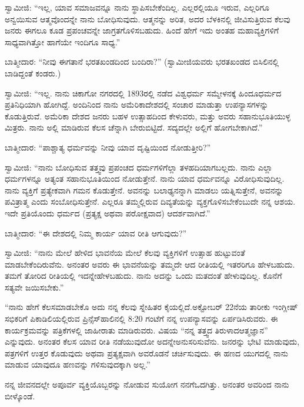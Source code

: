 ಸ್ವಾಮೀಜಿ: “ಇಲ್ಲ, ಯಾವ ಸಮಾಜವನ್ನೂ ನಾನು ಸ್ಥಾಪಿಸಬೇಕೆಂದಿಲ್ಲ. ಎಲ್ಲರಲ್ಲಿಯೂ ಇರುವ, ಎಲ್ಲರಿಗೂ ಅನ್ವಯಿಸುವ ಆತ್ಮವೊಂದನ್ನೇ ನಾನು ಬೋಧಿಸುವುದು. ಆತ್ಮನನ್ನು ಅರಿತ, ಅದರ ಬೆಳಕಿನಲ್ಲಿ ಜೀವಿಸುತ್ತಿರುವ ಕೆಲವು ಜನರು ಈಗಲೂ ಕೂಡ ಪ್ರಪಂಚವನ್ನೇ ಜಾಗ್ರತಗೊಳಿಸಬಹುದು. ಹಿಂದೆ ಹೇಗೆ ಇದು ಅಂತಹ ಮಹಾವ್ಯಕ್ತಿಗಳಿಗೆ ಸಾಧ್ಯವಾಗಿತ್ತೋ ಹಾಗೆಯೇ ಇಂದಿಗೂ ಸಾಧ್ಯ.”

ಬಾತ್ಮೀದಾರ: “ನೀವು ಈಗತಾನೆ ಭರತಖಂಡದಿಂದ ಬಂದಿರಾ?” (ಸ್ವಾಮೀಜಿಯವರು ಭರತಖಂಡದ ಬಿಸಿಲಿನಲ್ಲಿ ಬಾಡಿದ್ದಂತೆ ಕಂಡರು.)

ಸ್ವಾಮೀಜಿ: “ಇಲ್ಲ. ನಾನು ಚಿಕಾಗೋ ನಗರದಲ್ಲಿ 1893ರಲ್ಲಿ ನಡೆದ ವಿಶ್ವಧರ್ಮ ಸಮ್ಮೇಳನಕ್ಕೆ ಹಿಂದೂಧರ್ಮದ ಪ್ರತಿನಿಧಿಯಾಗಿ ಹೋಗಿದ್ದೆ. ಅಂದಿನಿಂದ ನಾನು ಅಮೆರಿಕಾ\break ದೇಶದಲ್ಲಿ ಸಂಚಾರ ಮಾಡುತ್ತಾ ಉಪನ್ಯಾಸಗಳನ್ನು ಕೊಡುತ್ತಿರುವೆ. ಅಮೆರಿಕಾ ದೇಶದ ಜನರು ಬಹಳ ಉತ್ಸಾಹದಿಂದ ಕೇಳುವರು, ಮತ್ತು ಅವರು ಸಹಾನುಭೂತಿಯುಳ್ಳ ಮಿತ್ರರು. ನಾನು ಅಲ್ಲಿ ಮಾಡಿರುವ ಕೆಲಸ ಚೆನ್ನಾಗಿ ಬೇರುಬಿಟ್ಟಿದೆ. ಸದ್ಯದಲ್ಲೇ ಅಲ್ಲಿಗೆ ಹೋಗಬೇಕಾಗಿದೆ.”

ಬಾತ್ಮೀದಾರ: “ಪಾಶ್ಚಾತ್ಯ ಧರ್ಮವನ್ನು ನೀವು ಯಾವ ದೃಷ್ಟಿಯಿಂದ ನೋಡುತ್ತೀರಿ?”

ಸ್ವಾಮೀಜಿ: “ನಾನು ಬೋಧಿಸುವ ತತ್ತ್ವವು ಪ್ರಪಂಚದ ಧರ್ಮಗಳಿಗೆಲ್ಲಾ ತಳಹದಿಯಾಗಬಲ್ಲದು. ನಾನು ಎಲ್ಲಾ ಧರ್ಮಗಳನ್ನೂ ಅತ್ಯಂತ ಸಹಾನುಭೂತಿಯಿಂದ ನೋಡುತ್ತೇನೆ. ನಾನು ಯಾವ ಧರ್ಮವನ್ನೂ ವಿರೋಧಿಸುವುದಿಲ್ಲ. ನಾನು ವ್ಯಕ್ತಿಗೆ ಪ್ರತ್ಯೇಕವಾಗಿ ಗಮನ ಕೊಡುತ್ತೇನೆ. ಅವನನ್ನು ಬಲಾಢ್ಯನನ್ನಾಗಿ ಮಾಡಲು ಯತ್ನಿಸುತ್ತೇನೆ, ಅವನನ್ನು ಪವಿತ್ರಾತ್ಮ ಎಂದು ಸಂಬೋಧಿಸುತ್ತೇನೆ. ಎಲ್ಲರೂ ತಮ್ಮಲ್ಲಿರುವ ದಿವ್ಯತೆಯನ್ನು ವ್ಯಕ್ತಗೊಳಿಸಬೇಕೆಂಬುದೇ ನನ್ನ ಆಶಯ. ಇದೇ ಪ್ರತಿಯೊಂದು ಧರ್ಮದ (ಪ್ರತ್ಯಕ್ಷ ಅಥವಾ ಪರೋಕ್ಷವಾದ) ಆದರ್ಶವಾಗಿದೆ.”

\vskip 3pt

ಬಾತ್ಮೀದಾರ: “ಈ ದೇಶದಲ್ಲಿ ನಿಮ್ಮ ಕಾರ್ಯ ಯಾವ ರೀತಿ ಆಗುವುದು?”

ಸ್ವಾಮೀಜಿ: “ನಾನು ಮೇಲೆ ಹೇಳಿದ ಭಾವನೆಯ ಮೇಲೆ ಕೆಲವು ವ್ಯಕ್ತಿಗಳಿಗೆ ಉತ್ಸಾಹ ಹುಟ್ಟುವಂತೆ ಮಾಡಬೇಕೆಂದಿರುವೆನು. ಅನಂತರ ಅವರು ಈ ಭಾವನೆಯನ್ನು ತಮ್ಮದೇ ಆದ ರೀತಿಯಲ್ಲಿ ಇತರರಿಗೂ ಹೇಳಬಹುದು. ತಮಗೆ ತೋರಿದ ರೀತಿಯಲ್ಲಿ ಇದನ್ನೇ\break ಹೇಳಬಹುದು. ನಾನು ಅದನ್ನು ಒಂದು ಮತದಂತೆ ಹೇಳುವುದಿಲ್ಲ. ಕೊನೆಗೆ ಸತ್ಯವೇ ಜಯಿಸಬೇಕು.”

\vskip 3pt

“ನಾನು ಹೇಗೆ ಕೆಲಸಮಾಡಬೇಕೊ ಅದು ನನ್ನ ಕೆಲವು ಸ್ನೇಹಿತರ ಕೈಯಲ್ಲಿದೆ.\break ಅಕ್ಟೋಬರ್​ 22ನೆಯ ತಾರೀಕು ಇಂಗ್ಲೀಷ್​ ಸಭಿಕರಿಗೆ ಪಿಕಾಡಿಲಿಯಲ್ಲಿರುವ ಪ್ರಿನ್ಸೆಸ್​\break ಹಾಲಿನಲ್ಲಿ 8:20 ಗಂಟೆಗೆ ನನ್ನ ಉಪನ್ಯಾಸವನ್ನು ಏರ್ಪಡಿಸಿರುವರು. ಈ ಕಾರ್ಯಕ್ರಮವನ್ನು ಪತ್ರಿಕೆಗಳಲ್ಲಿ ಜಾಹೀರಾತು ಮಾಡಿರುವರು. ವಿಷಯ “ನನ್ನ ತತ್ತ್ವದ ತಿರುಳಾದ\break ಆತ್ಮಜ್ಞಾನ” ಎನ್ನುವುದು. ಅನಂತರ ಕೆಲಸ ಯಾವ ರೀತಿ ನಡೆಯುವುದೋ ಅದನ್ನೇ\break ಅನುಸರಿಸುವೆನು. ಜನರನ್ನು ಭೇಟಿ ಮಾಡುವುದು, ಪತ್ರಗಳಿಗೆ ಉತ್ತರ ಕೊಡುವುದು ಅಥವಾ ಪ್ರತ್ಯಕ್ಷವಾಗಿ ಅವರೊಡನೆ ಚರ್ಚಿಸುವುದು. ಈ ಹಣದ ಯುಗದಲ್ಲಿ ನಾನು ಮಾಡುವ ಯಾವುದೂ ಹಣವನ್ನು ಗಳಿಸುವುದಕ್ಕಾಗಿ ಅಲ್ಲ.”

\vskip 3pt

ನನ್ನ ಜೀವನದಲ್ಲೇ ಅಪೂರ್ವ ವ್ಯಕ್ತಿಯೊಬ್ಬರನ್ನು ನೋಡುವ ಸುಯೋಗ ನನಗೆ\break ಒದಗಿತ್ತು. ಅನಂತರ ಅವರಿಂದ ನಾನು ಬೀಳ್ಕೊಂಡೆ.

